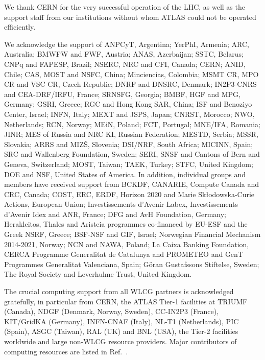 \documentclass[cernpreprint, backref=false, texlive=2020, UKenglish, dvipsnames, block=none, texmf]{atlasdoc}
\begin{document}
 
We thank CERN for the very successful operation of the LHC, as well as the
support staff from our institutions without whom ATLAS could not be
operated efficiently.
 
We acknowledge the support of
ANPCyT, Argentina;
YerPhI, Armenia;
ARC, Australia;
BMWFW and FWF, Austria;
ANAS, Azerbaijan;
SSTC, Belarus;
CNPq and FAPESP, Brazil;
NSERC, NRC and CFI, Canada;
CERN;
ANID, Chile;
CAS, MOST and NSFC, China;
Minciencias, Colombia;
MSMT CR, MPO CR and VSC CR, Czech Republic;
DNRF and DNSRC, Denmark;
IN2P3-CNRS and CEA-DRF/IRFU, France;
SRNSFG, Georgia;
BMBF, HGF and MPG, Germany;
GSRI, Greece;
RGC and Hong Kong SAR, China;
ISF and Benoziyo Center, Israel;
INFN, Italy;
MEXT and JSPS, Japan;
CNRST, Morocco;
NWO, Netherlands;
RCN, Norway;
MEiN, Poland;
FCT, Portugal;
MNE/IFA, Romania;
JINR;
MES of Russia and NRC KI, Russian Federation;
MESTD, Serbia;
MSSR, Slovakia;
ARRS and MIZ\v{S}, Slovenia;
DSI/NRF, South Africa;
MICINN, Spain;
SRC and Wallenberg Foundation, Sweden;
SERI, SNSF and Cantons of Bern and Geneva, Switzerland;
MOST, Taiwan;
TAEK, Turkey;
STFC, United Kingdom;
DOE and NSF, United States of America.
In addition, individual groups and members have received support from
BCKDF, CANARIE, Compute Canada and CRC, Canada;
COST, ERC, ERDF, Horizon 2020 and Marie Sk{\l}odowska-Curie Actions, European Union;
Investissements d'Avenir Labex, Investissements d'Avenir Idex and ANR, France;
DFG and AvH Foundation, Germany;
Herakleitos, Thales and Aristeia programmes co-financed by EU-ESF and the Greek NSRF, Greece;
BSF-NSF and GIF, Israel;
Norwegian Financial Mechanism 2014-2021, Norway;
NCN and NAWA, Poland;
La Caixa Banking Foundation, CERCA Programme Generalitat de Catalunya and PROMETEO and GenT Programmes Generalitat Valenciana, Spain;
G\"{o}ran Gustafssons Stiftelse, Sweden;
The Royal Society and Leverhulme Trust, United Kingdom.
 
The crucial computing support from all WLCG partners is acknowledged gratefully, in particular from CERN, the ATLAS Tier-1 facilities at TRIUMF (Canada), NDGF (Denmark, Norway, Sweden), CC-IN2P3 (France), KIT/GridKA (Germany), INFN-CNAF (Italy), NL-T1 (Netherlands), PIC (Spain), ASGC (Taiwan), RAL (UK) and BNL (USA), the Tier-2 facilities worldwide and large non-WLCG resource providers. Major contributors of computing resources are listed in Ref.~\cite{ATL-SOFT-PUB-2021-003}.
 
 
 
 
 
\clearpage
 
 
\printbibliography
\clearpage
 
 
 
 
 
\clearpage 
 
\end{document}
